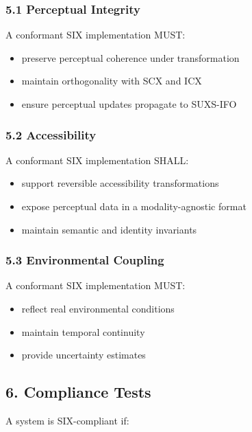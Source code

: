 \subsubsection{5.1 Perceptual Integrity}\label{perceptual-integrity}

A conformant SIX implementation MUST:

\begin{itemize}
\tightlist
\item
  preserve perceptual coherence under transformation
\item
  maintain orthogonality with SCX and ICX
\item
  ensure perceptual updates propagate to SUXS-IFO
\end{itemize}

\subsubsection{5.2 Accessibility}\label{accessibility}

A conformant SIX implementation SHALL:

\begin{itemize}
\tightlist
\item
  support reversible accessibility transformations
\item
  expose perceptual data in a modality-agnostic format
\item
  maintain semantic and identity invariants
\end{itemize}

\subsubsection{5.3 Environmental Coupling}\label{environmental-coupling}

A conformant SIX implementation MUST:

\begin{itemize}
\tightlist
\item
  reflect real environmental conditions
\item
  maintain temporal continuity
\item
  provide uncertainty estimates
\end{itemize}

\subsection{6. Compliance Tests}\label{compliance-tests}

A system is SIX-compliant if:

